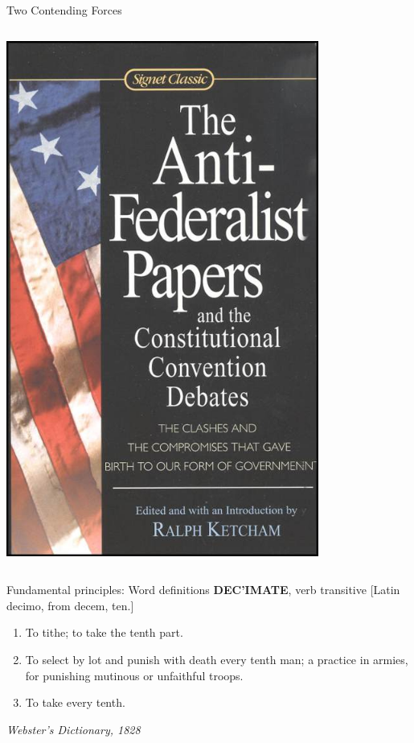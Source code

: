 \begin{frame}{Two Contending Forces}
\begin{columns}[onlytextwidth]
            \centering
            \includegraphics[width=0.8\textwidth]{img/anti-federalist.jpg} \\
    \end{columns}
\end{frame}

\begin{frame}{Fundamental principles: Word definitions}
    \textbf{DEC'IMATE}, verb transitive [Latin decimo, from decem, ten.]
    \begin{enumerate}
        \item To tithe; to take the tenth part.
        \item To select by lot and punish with death every tenth man; a practice in armies, for punishing mutinous or unfaithful troops.
        \item To take every tenth.
    \end{enumerate}
    \vspace{16pt}
    \textit{Webster's Dictionary, 1828}
\end{frame}

